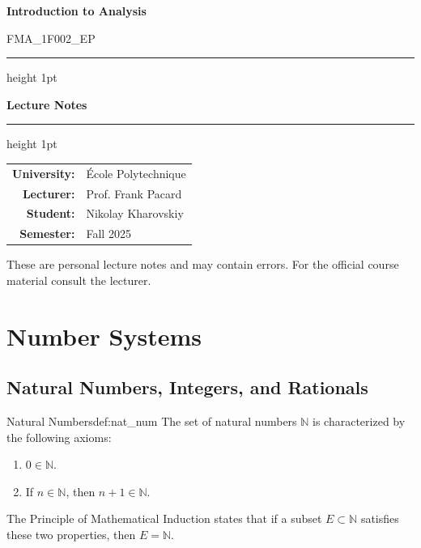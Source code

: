\documentclass[11pt, a4paper]{article}
\newcommand{\CourseName}{Introduction to Analysis}
\newcommand{\CourseCode}{FMA\_1F002\_EP}
\newcommand{\University}{École Polytechnique}
\newcommand{\Lecturer}{Prof. Frank Pacard}
\newcommand{\StudentName}{Nikolay Kharovskiy}
\newcommand{\Semester}{Fall 2025}
\begin{document}
\begin{titlepage}
  \centering
  \vspace*{2cm}

  {\Huge\bfseries \CourseName\par}
  \vspace{0.5cm}
  {\large \CourseCode\par}

  \vspace{1.5cm}
  \hrule height 1pt
  \vspace{0.4cm}
  {\Large\bfseries Lecture Notes \par}
  \vspace{0.4cm}
  \hrule height 1pt

  \vspace{2cm}

  \begin{tabular}{rl}
    \textbf{University:} & \University\\[8pt]
    \textbf{Lecturer:}   & \Lecturer\\[8pt]
    \textbf{Student:}    & \StudentName\\[8pt]
    \textbf{Semester:}   & \Semester\\[8pt]
  \end{tabular}

  \vfill

  {\small These are personal lecture notes and may contain errors.
         For the official course material consult the lecturer.}
\end{titlepage}

\tableofcontents
\newpage

\section{Number Systems}

\subsection{Natural Numbers, Integers, and Rationals}

\begin{definition}{Natural Numbers}{def:nat_num}
The set of natural numbers $\mathbb{N}$ is characterized by the following axioms:
\begin{enumerate}
    \item $0 \in \mathbb{N}$.
    \item If $n \in \mathbb{N}$, then $n+1 \in \mathbb{N}$.
\end{enumerate}
The Principle of Mathematical Induction states that if a subset $E \subset \mathbb{N}$ satisfies these two properties, then $E = \mathbb{N}$.
\end{definition}
\end{document}
